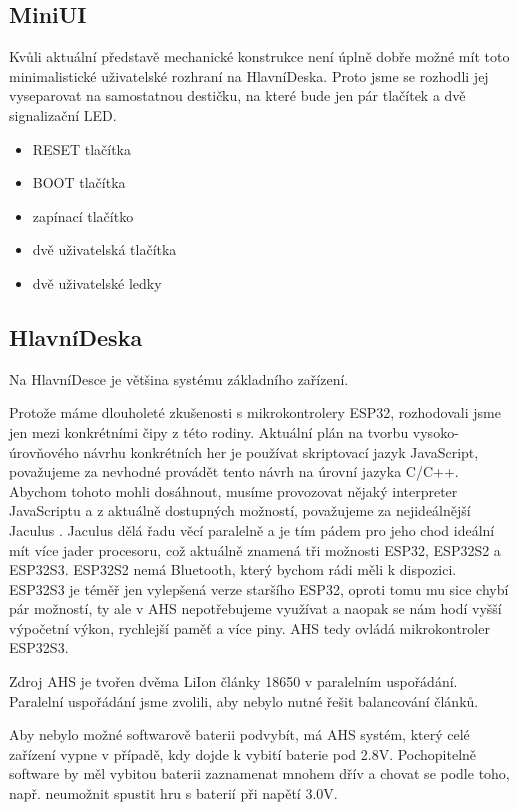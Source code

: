 \subsection{MiniUI}
Kvůli aktuální představě mechanické konstrukce není úplně dobře možné mít toto minimalistické uživatelské rozhraní na HlavníDeska.
Proto jsme se rozhodli jej vyseparovat na samostatnou destičku, na které bude jen pár tlačítek a dvě signalizační LED.

\begin{itemize}
    \item RESET tlačítka
    \item BOOT tlačítka
    \item zapínací tlačítko
    \item dvě uživatelská tlačítka 
    \item dvě uživatelské ledky
\end{itemize}

\subsection{HlavníDeska}
Na HlavníDesce je většina systému základního zařízení.

Protože máme dlouholeté zkušenosti s mikrokontrolery ESP32, rozhodovali jsme jen mezi konkrétními čipy z této rodiny.
Aktuální plán na tvorbu vysoko-úrovňového návrhu konkrétních her je používat skriptovací jazyk JavaScript, považujeme za nevhodné provádět tento návrh na úrovní jazyka C/C++.
Abychom tohoto mohli dosáhnout, musíme provozovat nějaký interpreter JavaScriptu a z aktuálně dostupných možností, považujeme za nejideálnější Jaculus \cite{Jaculus}.
Jaculus dělá řadu věcí paralelně a je tím pádem pro jeho chod ideální mít více jader procesoru, což aktuálně znamená tři možnosti ESP32, ESP32S2 a ESP32S3.
ESP32S2 nemá Bluetooth, který bychom rádi měli k dispozici.
ESP32S3 je téměř jen vylepšená verze staršího ESP32, oproti tomu mu sice chybí pár možností, ty ale v AHS nepotřebujeme využívat a naopak se nám hodí vyšší výpočetní výkon, rychlejší paměť a více piny.
AHS tedy ovládá mikrokontroler ESP32S3.

Zdroj AHS je tvořen dvěma LiIon články 18650 v paralelním uspořádání.
Paralelní uspořádání jsme zvolili, aby nebylo nutné řešit balancování článků.

Aby nebylo možné softwarově baterii podvybít, má AHS systém, který celé zařízení vypne v případě, kdy dojde k vybití baterie pod 2.8V.
Pochopitelně software by měl vybitou baterii zaznamenat mnohem dřív a chovat se podle toho, např. neumožnit spustit hru s baterií při napětí 3.0V.

